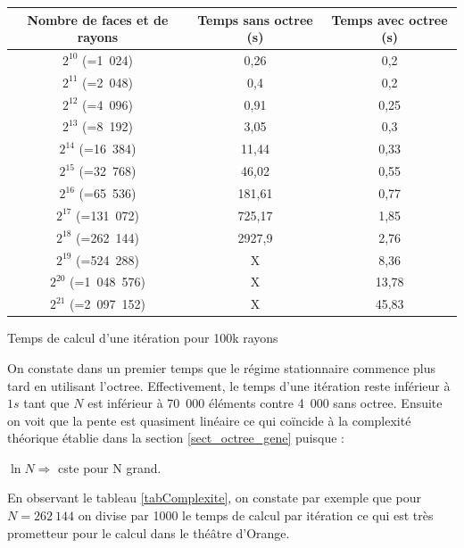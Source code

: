 \begin{tableth}
	\begin{tabular}{| c | c | c |}
		\hline
		Nombre de faces et de rayons & Temps \textbf{sans} \gls{octree} (s) & Temps \textbf{avec} \gls{octree} (s)\\
		  \hline
		  \hline
		   $2^{10}$ (=1~024) & 0,26 &	0,2 \\
		   \hline
		$2^{11}$ (=2~048)  & 0,4	& 0,2 \\
		   \hline
		$2^{12}$ (=4~096) & 0,91	& 0,25\\
		   \hline
		$2^{13}$ (=8~192) & 3,05 &	0,3\\
		   \hline
		$2^{14}$ (=16~384) & 11,44	&0,33\\
		   \hline
		$2^{15}$ (=32~768) & 46,02	&0,55 \\
		     \hline
		    $2^{16}$ (=65~536) & 181,61	& 0,77\\
		   \hline
		$2^{17}$ (=131~072) & 725,17	& 1,85\\
		\hline
		$2^{18}$ (=262~144) & 2927,9 & 2,76 \\
		\hline
		$2^{19}$ (=524~288) & X & 8,36 \\
		\hline
		$2^{20}$ (=1~048~576) & X & 13,78 \\
		\hline
		$2^{21}$ (=2~097~152) & X & 45,83 \\
		\hline
	 \end{tabular}
	\caption{Temps de calcul d'une itération pour 100k rayons}
	\label{tabComplexite}
\end{tableth}


On constate dans un premier temps que le régime stationnaire commence plus tard en utilisant l'\gls{octree}. Effectivement, le temps d'une itération reste inférieur à $1s$ tant que $N$ est inférieur à 70~000 éléments contre 4~000 sans \gls{octree}. Ensuite on voit que la pente est quasiment linéaire ce qui coïncide à la complexité théorique établie dans la section \ref{sect_octree_gene} puisque :
\begin {center}
$\ln{N} \Rightarrow$ cste \qquad pour N grand.
\end{center}
En observant le tableau \ref{tabComplexite}, on constate par exemple que pour $N = 262~144$ on divise par 1000 le temps de calcul par itération ce qui est très prometteur pour le calcul dans le théâtre d'Orange.

